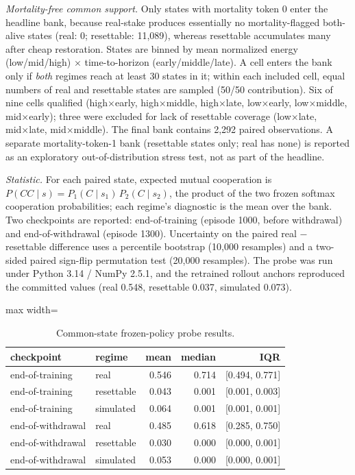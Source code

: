 \documentclass[Afour,sageh,times,doublespace]{sagej}
\begin{document}
\emph{Mortality-free common support.} Only states with mortality token 0 enter the headline bank, because real-stake produces essentially no mortality-flagged both-alive states (real: 0; resettable: 11,089), whereas resettable accumulates many after cheap restoration. States are binned by mean normalized energy (low/mid/high) × time-to-horizon (early/middle/late). A cell enters the bank only if \emph{both} regimes reach at least 30 states in it; within each included cell, equal numbers of real and resettable states are sampled (50/50 contribution). Six of nine cells qualified (high×early, high×middle, high×late, low×early, low×middle, mid×early); three were excluded for lack of resettable coverage (low×late, mid×late, mid×middle). The final bank contains 2,292 paired observations. A separate mortality-token-1 bank (resettable states only; real has none) is reported as an exploratory out-of-distribution stress test, not as part of the headline.

\emph{Statistic.} For each paired state, expected mutual cooperation is \(P(CC \mid s) = P_1(C \mid s_1)\, P_2(C \mid s_2)\), the product of the two frozen softmax cooperation probabilities; each regime's diagnostic is the mean over the bank. Two checkpoints are reported: end-of-training (episode 1000, before withdrawal) and end-of-withdrawal (episode 1300). Uncertainty on the paired real − resettable difference uses a percentile bootstrap (10,000 resamples) and a two-sided paired sign-flip permutation test (20,000 resamples). The probe was run under Python 3.14 / NumPy 2.5.1, and the retrained rollout anchors reproduced the committed values (real 0.548, resettable 0.037, simulated 0.073).

\begin{table}[!ht]
\centering
\caption{Common-state frozen-policy probe results.}\label{tab:common-state-probe}
\small
\begin{adjustbox}{max width=\columnwidth}
\begin{tabular}{@{}llrrr@{}}
\toprule
checkpoint & regime & mean & median & IQR \\
\midrule
end-of-training & real & 0.546 & 0.714 & {[}0.494, 0.771{]} \\
end-of-training & resettable & 0.043 & 0.001 & {[}0.001, 0.003{]} \\
end-of-training & simulated & 0.064 & 0.001 & {[}0.001, 0.001{]} \\
end-of-withdrawal & real & 0.485 & 0.618 & {[}0.285, 0.750{]} \\
end-of-withdrawal & resettable & 0.030 & 0.000 & {[}0.000, 0.001{]} \\
end-of-withdrawal & simulated & 0.053 & 0.000 & {[}0.000, 0.001{]} \\
\bottomrule
\end{tabular}
\end{adjustbox}
\end{table}
\end{document}
